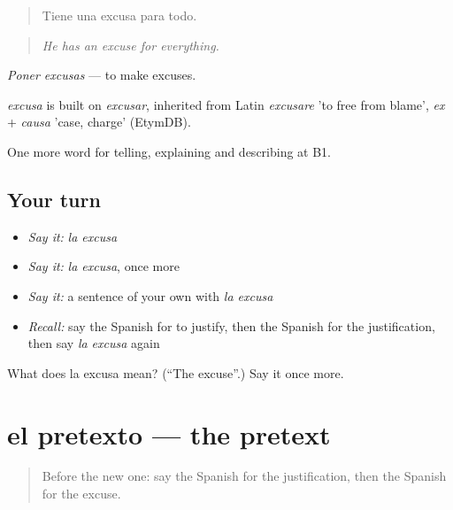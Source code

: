 \begin{quote}
Tiene una excusa para todo.
\end{quote}

\begin{quote}
\emph{He has an excuse for everything.}
\end{quote}

\emph{Poner excusas} — to make excuses.

\begin{cousinweb}
\emph{excusa} is built on \emph{excusar}, inherited from Latin \emph{excusare} 'to free from blame', \emph{ex} + \emph{causa} 'case, charge' (EtymDB).
\end{cousinweb}

\begin{grammarlens}[title={What you've built}]
One more word for telling, explaining and describing at B1.
\end{grammarlens}

\subsection*{Your turn}
\begin{itemize}
\raggedright
  \item \emph{Say it:} \emph{la excusa}
  \item \emph{Say it:} \emph{la excusa}, once more
  \item \emph{Say it:} a sentence of your own with \emph{la excusa}
  \item \emph{Recall:} say the Spanish for to justify, then the Spanish for the justification, then say \emph{la excusa} again
\end{itemize}

\begin{tcolorbox}[breakable,colback=teal!4,colframe=teal!35!black,title={Before you move on}]
What does la excusa mean? (\textquotedblleft{}The excuse\textquotedblright{}.) Say it once more.
\end{tcolorbox}
\section[el pretexto]{el pretexto — the pretext}

\label{lesson:ES-C586-pretexto}



\begin{quote}
Before the new one: say the Spanish for the justification, then the Spanish for the excuse.
\end{quote}


